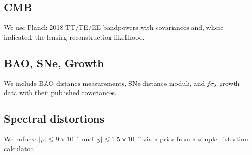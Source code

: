 
\subsection{CMB}
We use Planck 2018 TT/TE/EE bandpowers with covariances and, where indicated, the lensing reconstruction likelihood.

\subsection{BAO, SNe, Growth}
We include BAO distance measurements, SNe distance moduli, and $f\sigma_8$ growth data with their published covariances. 

\subsection{Spectral distortions}
We enforce $|\mu| \lesssim 9\times 10^{-5}$ and $|y|\lesssim 1.5\times 10^{-5}$ via a prior from a simple distortion calculator.
